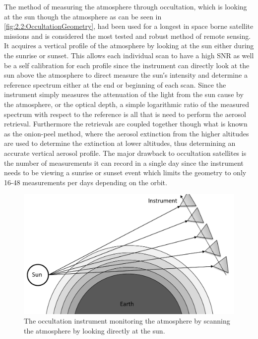 The method of measuring the atmosphere through occultation, which is looking at the sun though the atmosphere as can be seen in \autoref{fig:2.2:OccultationGeometry}, had been used for a longest in space borne satellite missions and is considered the most tested and robust method of remote sensing. It acquires a vertical profile of the atmosphere by looking at the sun either during the sunrise or sunset. This allows each individual scan to have a high SNR as well be a self calibration for each profile since the instrument can directly look at the sun above the atmosphere to direct measure the sun\si{\arcminute}s intensity and determine a reference spectrum either at the end or beginning of each scan. Since the instrument simply measures the attenuation of the light from the sun cause by the atmosphere, or the optical depth, a simple logarithmic ratio of the measured spectrum with respect to the reference is all that is need to perform the aerosol retrieval. Furthermore the retrievals are coupled together though what is known as the onion-peel method, where the aerosol extinction from the higher altitudes are used to determine the extinction at lower altitudes, thus determining an accurate vertical aerosol profile. The major drawback to occultation satellites is the number of measurements it can record in a single day since the instrument needs to be viewing a sunrise or sunset event which limits the geometry to only 16-48 measurements per days depending on the orbit.

\begin{figure}
    \includegraphics[width=1.0\textwidth]{./Images/2-2-OccultationGeometry.pdf}
    \caption[Occultation Geometry]{The occultation instrument monitoring the atmosphere by scanning the atmosphere by looking directly at the sun.}
    \label{fig:2.2:OccultationGeometry}
\end{figure}

